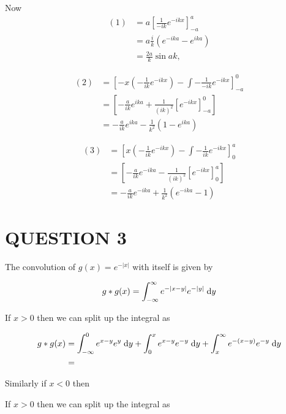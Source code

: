 \documentclass[a4paper]{article}
\begin{document}
Now \begin{align*}
(1) & = a \left[ \frac{1}{-ik} e^{-ikx}  \right]_{-a}^{a} \\
& = a \frac{i}{k} \left(  e^{-ika} - e^{ika} \right) \\
& = \frac{2a}{k} \sin a k,
\end{align*}


\begin{align*}
(2) & = \left[  -x \left( - \frac{1}{ik} e^{-ikx} \right) - \int - \frac{1}{- ik} e^{-ikx}  \right]_{-a}^{0} \\
& = \left[  - \frac{a}{ik} e^{ika} + \frac{1}{(ik)^{2}} \left[ e^{-ikx} \right]_{-a}^{0} \right] \\
& = - \frac{a}{ik} e^{ika} - \frac{1}{k^{2}} \left(  1 - e^{ika} \right) 
\end{align*}

\begin{align*}
(3) & = \left[ x \left( - \frac{1}{ik} e^{-ikx} \right) - \int - \frac{1}{ik} e^{-ikx}  \right]_{0}^{a} \\
& = \left[  - \frac{a}{ik} e^{-ika} - \frac{1}{(ik)^{2}} \left[ e^{-ikx} \right]_{0}^{a} \right] \\
& = - \frac{a}{ik} e^{-ika} + \frac{1}{k^{2}} \left( e^{-ika} - 1 \right) 
\end{align*}






\section{QUESTION 3}


The convolution of $ g(x) = e^{-| x |} $ with itself is given by

\begin{align*}
g * g(x) & = \int_{-\infty}^{\infty} e^{-| x - y|} e^{-| y |} \; \mathrm{d} y  \\
\end{align*}

If $ x > 0 $ then we can split up the integral as 

\begin{align*}
g * g(x) & = \int_{-\infty}^{0} e^{x - y} e^{y} \; \mathrm{d} y + \int_{0}^{x} e^{x - y} e^{-y} \; \mathrm{d} y + \int_{x}^{\infty} e^{-(x - y)} e^{-y} \; \mathrm{d} y \\
& = 
\end{align*}


Similarly if $ x < 0 $ then

If $ x > 0 $ then we can split up the integral as 
\end{document}

